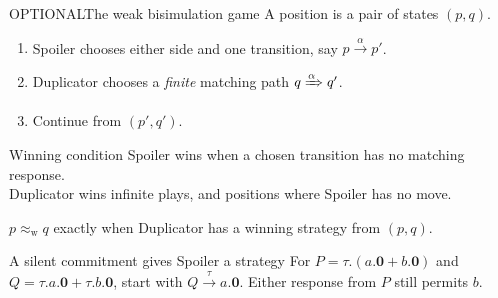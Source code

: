 \documentclass[handout,aspectratio=169,11pt]{beamer}
\newcommand{\step}[1]{\xrightarrow{#1}}
\newcommand{\wstep}[1]{\xRightarrow{#1}}
\newcommand{\wb}{\mathrel{\approx_{\mathrm w}}}
\newcommand{\nil}{\mathbf 0}
\newcommand{\Takeaway}[1]{\begin{exampleblock}{}#1\end{exampleblock}}
\newcommand{\optional}{\textcolor{Muted}{\scriptsize OPTIONAL}\quad}
\begin{document}
\begin{frame}{\optional The weak bisimulation game}
  A position is a pair of states $(p,q)$.
  \begin{enumerate}\setlength\itemsep{2.5mm}
    \item Spoiler chooses either side and one transition, say $p\step{\alpha}p'$.
    \item Duplicator chooses a \emph{finite} matching path $q\wstep{\alpha}q'$.
    \item Continue from $(p',q')$.
  \end{enumerate}
  \begin{block}{Winning condition}
    Spoiler wins when a chosen transition has no matching response.\\
    Duplicator wins infinite plays, and positions where Spoiler has no move.
  \end{block}
  \Takeaway{$p\wb q$ exactly when Duplicator has a winning strategy from $(p,q)$.}
  \begin{exampleblock}{A silent commitment gives Spoiler a strategy}
    For $P=\tau.(a.\nil+b.\nil)$ and $Q=\tau.a.\nil+\tau.b.\nil$, start with $Q\step{\tau}a.\nil$. Either response from $P$ still permits $b$.
  \end{exampleblock}
\end{frame}
\end{document}
